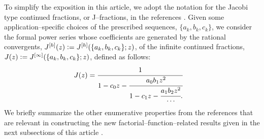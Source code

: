\documentclass[12pt,reqno]{article}
\numberwithin{sfootnote}{section}
\numberwithin{equation}{section}
\theoremstyle{plain}
\theoremstyle{definition}
\theoremstyle{remark}
\newcommand{\cf}[0]{cf.\ }
\newcommand{\defequals}{\ensuremath{\vcentcolon=}}
\begin{document}
To simplify the exposition in this article, we adopt the 
notation for the Jacobi type continued fractions, or J--fractions, 
in the references 
\citep{FLAJOLET80B,FLAJOLET82} 
\citep[\cf \S 3.10]{NISTHB} \citep[\cf \S 5.5]{GFLECT}. 
Given some application--specific choices of the prescribed 
sequences, $\{a_k, b_k, c_k\}$, we consider the 
formal power series whose coefficients are generated by the 
rational convergents, $J^{[h]}(z) \defequals J^{[h]}(\{a_k, b_k, c_k\}; z)$, 
of the infinite continued fractions, 
$J(z) \defequals J^{[\infty]}(\{a_k, b_k, c_k\}; z)$, defined as follows: 
\begin{align} 
\label{eqn_CF_exp_general_form} 
J(z) & = 
     \cfrac{1}{1-c_0z-\cfrac{a_0b_1 z^2}{1-c_1z- 
     \cfrac{a_1b_2 z^2}{\cdots}.}} 
\end{align} 
We briefly summarize the other enumerative properties from the 
references that are 
relevant in constructing the new factorial--function--related results 
given in the next subsections of this article 
\citep{FLAJOLET82,FLAJOLET80B} \citep[\S 5.5]{GFLECT} \citep[\cf \S 6.7]{GKP}. 
\end{document}
